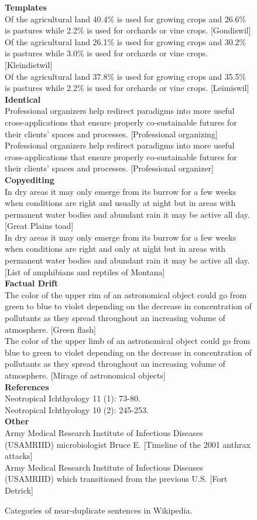 \documentclass[letterpaper]{article}
\begin{document}
\begin{figure}[t]
{\small
{\bf Templates}\\
Of the agricultural land 40.4\% is used for growing crops and 26.6\% is pastures while 2.2\% is used for orchards or vine crops. [Gondiswil] \\
Of the agricultural land 26.1\% is used for growing crops and 30.2\% is pastures while 3.0\% is used for orchards or vine crops. [Kleindietwil] \\
Of the agricultural land 37.8\% is used for growing crops and 35.5\% is pastures while 2.2\% is used for orchards or vine crops. [Leimiswil] \\[1ex]
{\bf Identical}\\
Professional organizers help redirect paradigms into more useful cross-applications that ensure properly co-sustainable futures for their clients' spaces and processes. [Professional organizing] \\
Professional organizers help redirect paradigms into more useful cross-applications that ensure properly co-sustainable futures for their clients' spaces and processes. [Professional organizer] \\[1ex]
{\bf Copyediting}\\
In dry areas it may only emerge from its burrow for a few weeks when conditions are right and usually at night but in areas with permanent water bodies and abundant rain it may be active all day. [Great Plains toad] \\
In dry areas it may only emerge from its burrow for a few weeks when conditions are right and only at night but in areas with permanent water bodies and abundant rain it may be active all day. [List of amphibians and reptiles of Montana]\\[1ex]
{\bf Factual Drift}\\
The color of the upper rim of an astronomical object could go from green to blue to violet depending on the decrease in concentration of pollutants as they spread throughout an increasing volume of atmosphere. [Green flash] \\
The color of the upper limb of an astronomical object could go from blue to green to violet depending on the decrease in concentration of pollutants as they spread throughout an increasing volume of atmosphere. [Mirage of astronomical objects] \\[1ex]
{\bf References}\\
Neotropical Ichthyology 11 (1): 73-80. \\
Neotropical Ichthyology 10 (2): 245-253. \\[1ex]
{\bf Other}\\
Army Medical Research Institute of Infectious Diseases (USAMRIID) microbiologist Bruce E. [Timeline of the 2001 anthrax attacks] \\
Army Medical Research Institute of Infectious Diseases (USAMRIID) which transitioned from the previous U.S. [Fort Detrick]}
\caption{Categories of near-duplicate sentences in Wikipedia.}
\label{toparticlegroups}
\end{figure}
\end{document}
